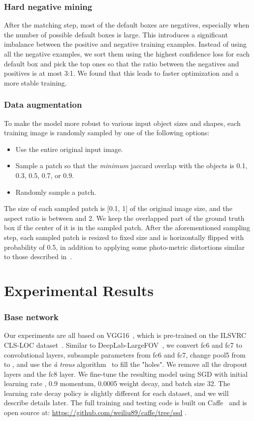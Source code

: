 \documentclass[runningheads]{llncs}
\begin{document}
\subsubsection{Hard negative mining}
\label{sec:hardnegative}
After the matching step, most of the default boxes are negatives, especially when the number of possible default boxes is large. This introduces a significant imbalance between the positive and negative training examples. Instead of using all the negative examples, we sort them using the highest confidence loss for each default box and pick the top ones so that the ratio between the negatives and positives is at most 3:1. We found that this leads to faster optimization and a more stable training.
\vspace{-1em}
\subsubsection{Data augmentation}
\label{sec:dataaugmentation}
To make the model more robust to various input object sizes and shapes, each training image is randomly sampled by one of the following options:
\begin{itemize}
\setlength\itemsep{0em}
\item Use the entire original input image.
\item Sample a patch so that the \emph{minimum} jaccard overlap with the objects is 0.1, 0.3, 0.5, 0.7, or 0.9.
\item Randomly sample a patch.
\end{itemize}
The size of each sampled patch is [0.1, 1] of the original image size, and the aspect ratio is between  and 2. We keep the overlapped part of the ground truth box if the center of it is in the sampled patch. After the aforementioned sampling step, each sampled patch is resized to fixed size and is horizontally flipped with probability of 0.5, in addition to applying some photo-metric distortions similar to those described in~\cite{howard2013some}.

\section{Experimental Results} \label{sec:exp}
\subsubsection{Base network} Our experiments are all based on VGG16~\cite{simonyan2014very}, which is pre-trained on the ILSVRC CLS-LOC dataset~\cite{russakovsky2014imagenet}. Similar to DeepLab-LargeFOV~\cite{chen2014semantic}, we convert fc6 and fc7 to convolutional layers, subsample parameters from fc6 and fc7, change pool5 from  to , and use the \emph{\`{a} trous} algorithm~\cite{holschneider1990real} to fill the "holes". We remove all the dropout layers and the fc8 layer. We fine-tune the resulting model using SGD with initial learning rate , 0.9 momentum, 0.0005 weight decay, and batch size 32. The learning rate decay policy is slightly different for each dataset, and we will describe details later. The full training and testing code is built on Caffe~\cite{jia2014caffe} and is open source at: \url{https://github.com/weiliu89/caffe/tree/ssd} .
\end{document}

